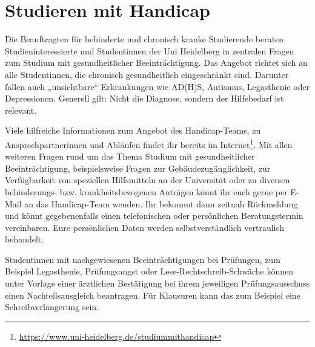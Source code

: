 \section{Studieren mit Handicap}
Die Beauftragten für behinderte und chronisch kranke Studierende beraten Studieninteressierte und Studentinnen der Uni Heidelberg in zentralen Fragen zum Studium mit gesundheitlicher Beeinträchtigung.
Das Angebot richtet sich an alle Studentinnen, die chronisch gesundheitlich eingeschränkt sind. Darunter fallen auch „unsichtbare“ Erkrankungen wie AD(H)S, Autismus, Legasthenie oder Depressionen. Generell gilt: Nicht die Diagnose, sondern der Hilfebedarf ist relevant.

Viele hilfreiche Informationen zum Angebot des Handicap-Teams, zu Ansprechpartnerinnen und Abläufen findet ihr bereits im Internet\footnote{\url{https://www.uni-heidelberg.de/studiummithandicap}}. Mit allen weiteren Fragen rund um das Thema Studium mit gesundheitlicher Beeinträchtigung, beispielsweise Fragen zur Gebäudezugänglichkeit,  zur Verfügbarkeit von speziellen Hilfsmitteln an der Universität oder zu diversen behinderungs- bzw. krankheitsbezogenen Anträgen könnt ihr euch gerne per E-Mail an das Handicap-Team wenden. Ihr bekommt dann zeitnah Rückmeldung und könnt gegebenenfalls einen telefonischen oder persönlichen Beratungstermin vereinbaren.
Eure persönlichen Daten werden selbstverständlich vertraulich behandelt.

Studentinnen mit nachgewiesenen Beeinträchtigungen bei Prüfungen, zum Beispiel Legasthenie, Prüfungsangst oder Lese-Rechtschreib-Schwäche können unter Vorlage einer ärztlichen Bestätigung bei ihrem jeweiligen Prüfungsausschuss einen Nachteilsausgleich beantragen. Für Klausuren kann das zum Beispiel eine Schreibverlängerung sein.
